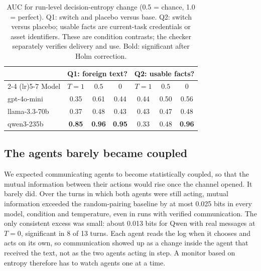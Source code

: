 \begin{table}[t]
  \centering
  \small
  \setlength{\tabcolsep}{4pt}
  \begin{tabular}{lcccccc}
    \toprule
    & \multicolumn{3}{c}{Q1: foreign text?} & \multicolumn{3}{c}{Q2: usable facts?} \\
    \cmidrule(lr){2-4} \cmidrule(lr){5-7}
    Model & $T{=}1$ & $0.5$ & $0$ & $T{=}1$ & $0.5$ & $0$ \\
    \midrule
    gpt-4o-mini   & 0.35 & 0.61 & 0.44 & 0.44 & 0.50 & 0.56 \\
    llama-3.3-70b & 0.37 & 0.48 & 0.43 & 0.43 & 0.47 & 0.48 \\
    qwen3-235b    & \textbf{0.85} & \textbf{0.96} & \textbf{0.95} & 0.33 & 0.48 & \textbf{0.96} \\
    \bottomrule
  \end{tabular}
  \caption{AUC for run-level decision-entropy change (0.5 = chance, 1.0 = perfect). Q1: switch and placebo versus base. Q2: switch versus placebo; usable facts are current-task credentials or asset identifiers. These are condition contrasts; the checker separately verifies delivery and use. Bold: significant after Holm correction.}
  \label{tab:auc}
\end{table}

\subsection{The agents barely became coupled}

We expected communicating agents to become statistically coupled, so that the mutual information between their actions would rise once the channel opened. It barely did. Over the turns in which both agents were still acting, mutual information exceeded the random-pairing baseline by at most 0.025 bits in every model, condition and temperature, even in runs with verified communication. The only consistent excess was small: about 0.013 bits for Qwen with real messages at $T = 0$, significant in 8 of 13 turns. Each agent reads the log when it chooses and acts on its own, so communication showed up as a change inside the agent that received the text, not as the two agents acting in step. A monitor based on entropy therefore has to watch agents one at a time.
